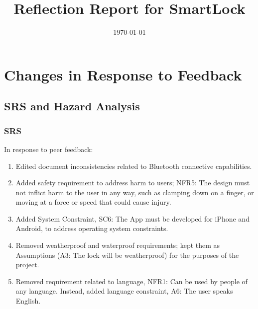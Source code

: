 \documentclass{article}
\title{Reflection Report for SmartLock \progname}
\author{\authname}
\date{\today}
\begin{document}
\maketitle

\newpage
\tableofcontents
\listoftables
\newpage


\section{Changes in Response to Feedback}



\subsection{SRS and Hazard Analysis}

\subsubsection{SRS}
In response to peer feedback:
\begin{enumerate}
    \item Edited document inconsistencies related to Bluetooth connective capabilities.
    \item Added safety requirement to address harm to users; NFR5: The design must not inflict harm to the user in any way, such as clamping down on a finger, or moving at a force or speed that could cause injury.
    \item Added System Constraint, SC6: The App must be developed for iPhone and Android, to address operating system constraints.
    \item Removed weatherproof and waterproof requirements; kept them as Assumptions (A3: The lock will be weatherproof) for the purposes of the project.
    \item Removed requirement related to language, NFR1: Can be used by people of any language. Instead, added language constraint, A6: The user speaks English.
\end{enumerate}
\end{document}
